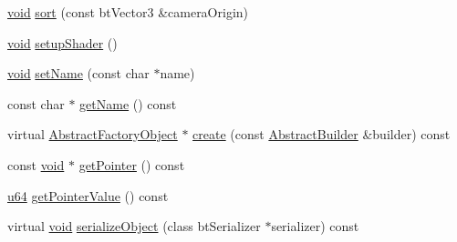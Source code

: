 \begin{DoxyCompactItemize}
\mbox{\hyperlink{_thread_8h_af1e856da2e658414cb2456cb6f7ebc66}{void}} \mbox{\hyperlink{classnjli_1_1_geometry_a60f8058a4afac8cfe23aa33ae1382fbd}{sort}} (const bt\+Vector3 \&camera\+Origin)
\item 
\mbox{\hyperlink{_thread_8h_af1e856da2e658414cb2456cb6f7ebc66}{void}} \mbox{\hyperlink{classnjli_1_1_geometry_ae448a8fa9c7aaccd9db8ed6dfcf62dab}{setup\+Shader}} ()
\item 
\mbox{\hyperlink{_thread_8h_af1e856da2e658414cb2456cb6f7ebc66}{void}} \mbox{\hyperlink{classnjli_1_1_geometry_a087eb5f8d9f51cc476f12f1d10a3cb95}{set\+Name}} (const char $\ast$name)
\item 
const char $\ast$ \mbox{\hyperlink{classnjli_1_1_geometry_ad41266885be835f3ee602311e20877a4}{get\+Name}} () const
\item 
virtual \mbox{\hyperlink{classnjli_1_1_abstract_factory_object}{Abstract\+Factory\+Object}} $\ast$ \mbox{\hyperlink{classnjli_1_1_geometry_a83a8876ae63b92804004cf3febe76573}{create}} (const \mbox{\hyperlink{classnjli_1_1_abstract_builder}{Abstract\+Builder}} \&builder) const
\item 
const \mbox{\hyperlink{_thread_8h_af1e856da2e658414cb2456cb6f7ebc66}{void}} $\ast$ \mbox{\hyperlink{classnjli_1_1_geometry_ac4ca71716ed832be357f15f8262c8448}{get\+Pointer}} () const
\item 
\mbox{\hyperlink{_util_8h_ad758b7a5c3f18ed79d2fcd23d9f16357}{u64}} \mbox{\hyperlink{classnjli_1_1_geometry_a4ffddf141a426a5a07d0ac19f1913811}{get\+Pointer\+Value}} () const
\item 
virtual \mbox{\hyperlink{_thread_8h_af1e856da2e658414cb2456cb6f7ebc66}{void}} \mbox{\hyperlink{classnjli_1_1_geometry_a4fc4bcd9d1930911474210c047372fc0}{serialize\+Object}} (class bt\+Serializer $\ast$serializer) const
\end{DoxyCompactItemize}
